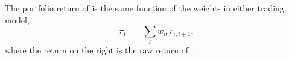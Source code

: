 The portfolio return of  is the same function of the weights in either trading model,
%
\begin{equation}\label{eq:payoff}
  \pi_t \;=\; \sum_i w_{it}\, r_{i,t+1},
\end{equation}
%
where the return on the right is the raw return of .


